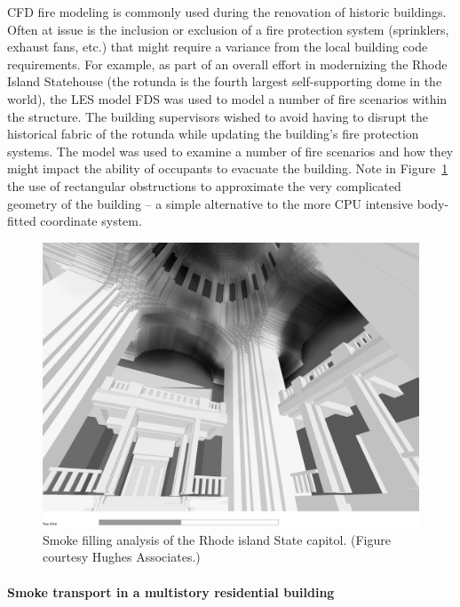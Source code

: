 \documentclass[graybox]{svmult}
\begin{document}
CFD fire modeling is commonly used during the renovation of historic buildings. Often at issue is the inclusion or exclusion of a fire protection system (sprinklers, exhaust fans, etc.) that might require a variance from the local building code requirements. For example, as part of an overall effort in modernizing the Rhode Island Statehouse (the rotunda is the fourth largest self-supporting dome in the world), the LES model FDS was used to model a number of fire scenarios within the structure. The building supervisors wished to avoid having to disrupt the historical fabric of the rotunda while updating the building's fire protection systems. The model was used to examine a number of fire scenarios and how they might impact the ability of occupants to evacuate the building. Note in Figure~\ref{Dome} the use of rectangular obstructions to approximate the very complicated geometry of the building -- a simple alternative to the more CPU intensive body-fitted coordinate system.

\begin{figure}[ht]
\includegraphics[width=\textwidth]{state_house}
\caption{Smoke filling analysis of the Rhode island State capitol. (Figure courtesy Hughes Associates.)}
\label{Dome}
\end{figure}




\paragraph{Smoke transport in a multistory residential building}
\end{document}
